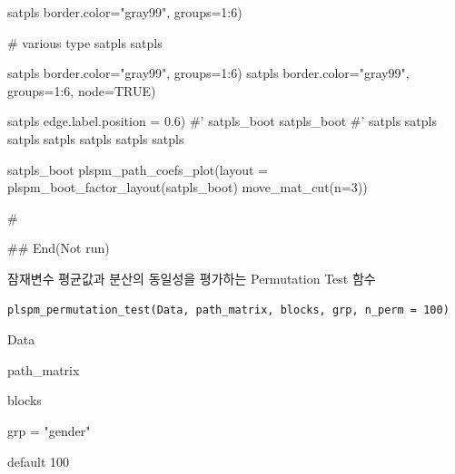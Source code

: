 \documentclass[a4paper]{book}
\begin{document}
\begin{Examples}
\begin{ExampleCode}
satpls %
                            border.color="gray99", groups=1:6)


# various type
satpls %
satpls %

satpls %
                                 border.color="gray99", groups=1:6)
satpls %
                                 border.color="gray99", groups=1:6, node=TRUE)

satpls %
                                 edge.label.position = 0.6)
#'
satpls_boot%
satpls_boot%
#'
satpls %
satpls %
satpls %
satpls %
satpls %
satpls %
satpls %

satpls_boot %
plspm_path_coefs_plot(layout =  plspm_boot_factor_layout(satpls_boot)%
 move_mat_cut(n=3))

\#



## End(Not run)
\end{ExampleCode}
\end{Examples}
%
\begin{Description}
잠재변수 평균값과 분산의 동일성을 평가하는 Permutation Test 함수
\end{Description}
%
\begin{Usage}
\begin{verbatim}
plspm_permutation_test(Data, path_matrix, blocks, grp, n_perm = 100)
\end{verbatim}
\end{Usage}
%
\begin{Arguments}
\begin{ldescription}
\item[\code{Data}] Data

\item[\code{path\_matrix}] path\_matrix

\item[\code{blocks}] blocks

\item[\code{grp}] grp = "gender"

\item[\code{n\_perm}] default 100
\end{ldescription}
\end{Arguments}
\end{document}
